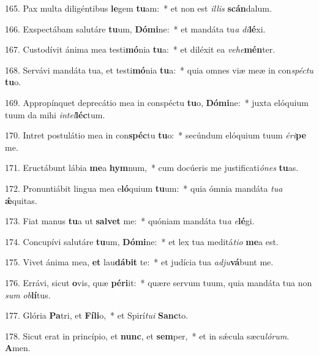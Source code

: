 165. Pax multa diligéntibus \textbf{le}gem \textbf{tu}am:~*  et non est \textit{il}\textit{lis} \textbf{scán}dalum.\

166. Exspectábam salutáre \textbf{tu}um, \textbf{Dó}\textbf{mi}ne:~*  et mandáta tu\textit{a} \textit{di}\textbf{lé}xi.\

167. Custodívit ánima mea testi\textbf{mó}nia \textbf{tu}a:~*  et diléxit ea \textit{ve}\textit{he}\textbf{mén}ter.\

168. Servávi mandáta tua, et testi\textbf{mó}nia \textbf{tu}a:~*  quia omnes viæ meæ in con\textit{spéc}\textit{tu} \textbf{tu}o.\

169. Appropínquet deprecátio mea in conspéctu \textbf{tu}o, \textbf{Dó}\textbf{mi}ne:~*  juxta elóquium tuum da mihi \textit{in}\textit{tel}\textbf{léc}tum.\

170. Intret postulátio mea in con\textbf{spéc}tu \textbf{tu}o:~*  secúndum elóquium tuum \textit{é}\textit{ri}\textbf{pe} me.\

171. Eructábunt lábia \textbf{me}a \textbf{hym}num,~*  cum docúeris me justificati\textit{ó}\textit{nes} \textbf{tu}as.\

172. Pronuntiábit lingua mea e\textbf{ló}quium \textbf{tu}um:~*  quia ómnia mandáta \textit{tu}\textit{a} \textbf{ǽ}quitas.\

173. Fiat manus \textbf{tu}a ut \textbf{sal}\textbf{vet} me:~*  quóniam mandáta tu\textit{a} \textit{e}\textbf{lé}gi.\

174. Concupívi salutáre \textbf{tu}um, \textbf{Dó}\textbf{mi}ne:~*  et lex tua meditá\textit{ti}\textit{o} \textbf{me}a est.\

175. Vivet ánima mea, \textbf{et} lau\textbf{dá}\textbf{bit} te:~*  et judícia tua \textit{ad}\textit{ju}\textbf{vá}bunt me.\

176. Errávi, sicut \textbf{o}vis, quæ \textbf{pér}\textbf{i}it:~*  quære servum tuum, quia mandáta tua non \textit{sum} \textit{ob}\textbf{lí}tus.\

177. Glória \textbf{Pa}tri, et \textbf{Fí}\textbf{li}o,~*  et Spirí\textit{tu}\textit{i} \textbf{Sanc}to.\

178. Sicut erat in princípio, et \textbf{nunc}, et \textbf{sem}per,~*  et in sǽcula sæcu\textit{ló}\textit{rum}. \textbf{A}men.\

